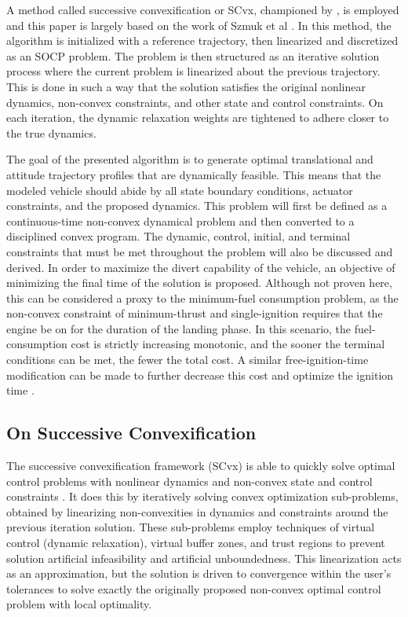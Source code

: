 \documentclass[conf]{new-aiaa}
\begin{document}
A method called successive convexification or SCvx, championed by \cite{mao2016successive}, is employed and this paper is largely based on the work of Szmuk et al \cite{szmuk2018successive}. In this method, the algorithm is initialized with a reference trajectory, then linearized and discretized as an SOCP problem. The problem is then structured as an iterative solution process where the current problem is linearized about the previous trajectory. This is done in such a way that the solution satisfies the original nonlinear dynamics, non-convex constraints, and other state and control constraints. On each iteration, the dynamic relaxation weights are tightened to adhere closer to the true dynamics.

The goal of the presented algorithm is to generate optimal translational and attitude trajectory profiles that are dynamically feasible. This means that the modeled vehicle should abide by all state boundary conditions, actuator constraints, and the proposed dynamics. This problem will first be defined as a continuous-time non-convex dynamical problem and then converted to a disciplined convex program. The dynamic, control, initial, and terminal constraints that must be met throughout the problem will also be discussed and derived. In order to maximize the divert capability of the vehicle, an objective of minimizing the final time of the solution is proposed. Although not proven here, this can be considered a proxy to the minimum-fuel consumption problem, as the non-convex constraint of minimum-thrust and single-ignition requires that the engine be on for the duration of the landing phase. In this scenario, the fuel-consumption cost is strictly increasing monotonic, and the sooner the terminal conditions can be met, the fewer the total cost. A similar free-ignition-time modification can be made to further decrease this cost and  optimize the ignition time \cite{szmuk2019successive}. 

\subsection{On Successive Convexification}
The successive convexification framework (SCvx) is able to quickly solve optimal control problems with nonlinear dynamics and non-convex state and control constraints \cite{szmuk2018successive}. It does this by iteratively solving convex optimization sub-problems, obtained by linearizing non-convexities in dynamics and constraints around the previous iteration solution. These sub-problems employ techniques of virtual control (dynamic relaxation), virtual buffer zones, and trust regions to prevent solution artificial infeasibility and artificial unboundedness. This linearization acts as an approximation, but the solution is driven to convergence within the user's tolerances to solve exactly the originally proposed non-convex optimal control problem with local optimality.
\end{document}
